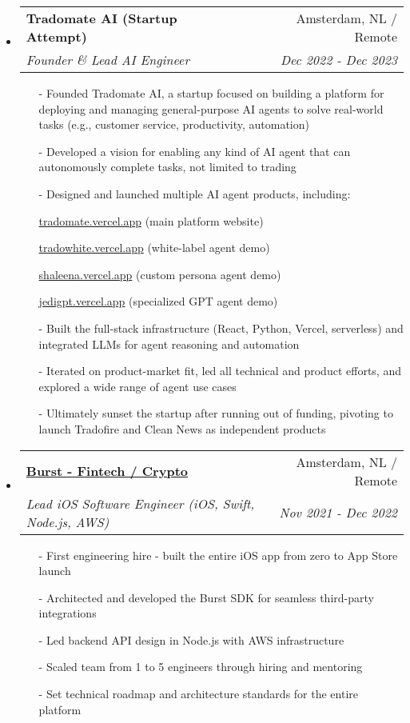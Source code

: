 \documentclass[letterpaper,11pt]{article}
\makeatletter
\newcommand{\ressubheading}[4]{
\begin{tabular*}{7.0in}{l@{\extracolsep{\fill}}r}
    \textbf{#1} & #2 \\
    \textit{#3} & \textit{#4} \\
\end{tabular*}\vspace{-6pt}}
\makeatother
\begin{document}
\begin{itemize}
\item
    \ressubheading{Tradomate AI (Startup Attempt)}{Amsterdam, NL / Remote}{Founder \& Lead AI Engineer}{Dec 2022 - Dec 2023}
    \begin{itemize}
        \item[-]{Founded Tradomate AI, a startup focused on building a platform for deploying and managing general-purpose AI agents to solve real-world tasks (e.g., customer service, productivity, automation)}
        \item[-]{Developed a vision for enabling any kind of AI agent that can autonomously complete tasks, not limited to trading}
        \item[-]{Designed and launched multiple AI agent products, including:}
        \item[\hspace{1em}]\href{https://tradomate.vercel.app}{tradomate.vercel.app} (main platform website)
        \item[\hspace{1em}]\href{https://tradowhite.vercel.app}{tradowhite.vercel.app} (white-label agent demo)
        \item[\hspace{1em}]\href{https://shaleena.vercel.app}{shaleena.vercel.app} (custom persona agent demo)
        \item[\hspace{1em}]\href{https://jedigpt.vercel.app}{jedigpt.vercel.app} (specialized GPT agent demo)
        \item[-]{Built the full-stack infrastructure (React, Python, Vercel, serverless) and integrated LLMs for agent reasoning and automation}
        \item[-]{Iterated on product-market fit, led all technical and product efforts, and explored a wide range of agent use cases}
        \item[-]{Ultimately sunset the startup after running out of funding, pivoting to launch Tradofire and Clean News as independent products}
    \end{itemize}

\item
    \ressubheading{\href{https://www.joinburst.com}{Burst - Fintech / Crypto}}{Amsterdam, NL / Remote}{Lead iOS Software Engineer (iOS, Swift, Node.js, AWS)}{Nov 2021 - Dec 2022}
    \begin{itemize}
        \item[-]{First engineering hire - built the entire iOS app from zero to App Store launch}
        \item[-]{Architected and developed the Burst SDK for seamless third-party integrations}
        \item[-]{Led backend API design in Node.js with AWS infrastructure}
        \item[-]{Scaled team from 1 to 5 engineers through hiring and mentoring}
        \item[-]{Set technical roadmap and architecture standards for the entire platform}
    \end{itemize}


\end{itemize}
\end{document}
